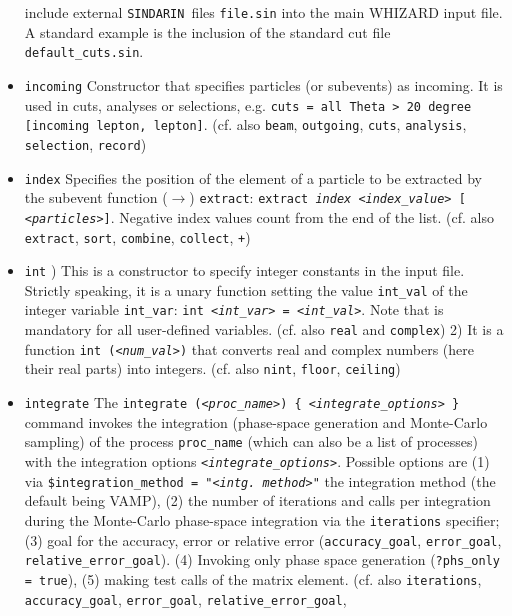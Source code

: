 \documentclass[12pt]{book}
\newcommand{\ttt}[1]{\texttt{#1}}
\newcommand{\sindarin}{\ttt{SINDARIN}}
\begin{document}
\begin{itemize}
include external \sindarin\ files \ttt{file.sin} into the main WHIZARD
input file. A standard example is the inclusion of the standard cut
file \ttt{default\_cuts.sin}.
\item
\ttt{incoming} \newline
Constructor that specifies particles (or subevents) as incoming. It is
used in cuts, analyses or selections, e.g. \ttt{cuts = all Theta > 20
degree [incoming lepton, lepton]}. (cf. also \ttt{beam}, \ttt{outgoing},
\ttt{cuts}, \ttt{analysis}, \ttt{selection}, \ttt{record})
\item
\ttt{index} \newline
Specifies the position of the element of a particle to be extracted by
the subevent function ($\to$) \ttt{extract}: \ttt{extract {\em index
<index\_value>} [ {\em <particles>}]}. Negative index values count
from the end of the list. (cf. also \ttt{extract}, \ttt{sort}, \ttt{combine},
\ttt{collect}, \ttt{+})
\item
\ttt{int} ) This is a constructor to specify integer constants in the input
file. Strictly speaking, it is a unary function setting the value
\ttt{int\_val} of the integer variable \ttt{int\_var}:
\ttt{int {\em <int\_var>} = {\em <int\_val>}}. Note that is mandatory for all
user-defined variables. (cf. also \ttt{real} and \ttt{complex})
2) It is a function \ttt{int ({\em <num\_val>})} that converts real and
complex numbers (here their real parts) into integers. (cf. also
\ttt{nint}, \ttt{floor}, \ttt{ceiling})
\item
\ttt{integrate} \newline
The \ttt{integrate ({\em <proc\_name>}) \{ {\em <integrate\_options>} \}} command
invokes the integration (phase-space generation and Monte-Carlo
sampling) of the process \ttt{proc\_name} (which can also be a list of
processes) with the integration options
\ttt{{\em <integrate\_options>}}. Possible options are (1) via
\ttt{\$integration\_method = "{\em <intg. method>}"} the integration
method (the default being VAMP), (2) the number of iterations and
calls per integration during the Monte-Carlo phase-space integration
via the \ttt{iterations} specifier; (3) goal for the
accuracy, error or relative error (\ttt{accuracy\_goal},
\ttt{error\_goal}, \ttt{relative\_error\_goal}). (4) Invoking only
phase space generation (\ttt{?phs\_only = true}), (5) making test
calls of the matrix element. (cf. also \ttt{iterations},
\ttt{accuracy\_goal}, \ttt{error\_goal}, \ttt{relative\_error\_goal},

\end{itemize}
\end{document}
